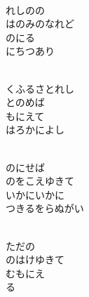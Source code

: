 \documentclass[10pt,b5j]{tarticle} %
\begin{document}
\vspace{1.5em} %
\newcommand{\linespace}{0.5em} %
\newcommand{\blocksize}{0.5\hsize} %
\newcommand{\itemmargin}{6em} %
\begin{enumerate} %
    \setlength{\itemindent}{\itemmargin} %
    \begin{minipage}[c]{\blocksize}
    
        \vspace{\linespace}
        \item~\\
        れしのの\\
        はのみのなれど\\
        のにる\\
        にちつあり
        
        \vspace{\linespace}
        \item~\\
        くふるさとれし\\
        とのめば\\
        もにえて\\
        はろかによし
        
        \vspace{\linespace}
        \item~\\
        のにせば\\
        のをこえゆきて\\
        いかにいかに\\
        つきるをらぬがい
        
        \vspace{\linespace}
        \item~\\
        ただの\\
        のはけゆきて\\
        むもにえ\\
        る
    
    \end{minipage}
\end{enumerate} %
\end{document}
